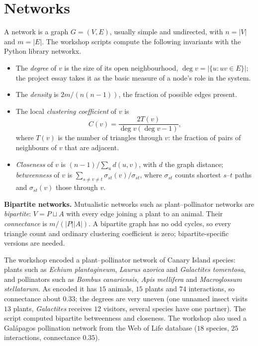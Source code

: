 \section{Networks}
\label{section-networks}

A network is a graph $G=(V,E)$, usually
simple and undirected, with $n=|V|$ and
$m=|E|$. The workshop scripts compute
the following invariants with the Python
library networkx.

\begin{itemize}
\item The \emph{degree} of $v$ is the size
of its open neighbourhood,
$\deg v = |\{u : uv\in E\}|$; the
project essay takes it as the basic measure
of a node's role in the system.
\item The \emph{density} is
$2m/(n(n-1))$, the fraction of possible
edges present.
\item The local \emph{clustering
coefficient} of $v$ is
$$
C(v) = \frac{2T(v)}{\deg v(\deg v-1)},
$$
where $T(v)$ is the number of triangles
through $v$: the fraction of pairs of
neighbours of $v$ that are adjacent.
\item \emph{Closeness} of $v$ is
$(n-1)/\sum_{u}d(u,v)$, with $d$ the
graph distance; \emph{betweenness} of $v$
is $\sum_{s\ne v\ne t}
\sigma_{st}(v)/\sigma_{st}$, where
$\sigma_{st}$ counts shortest $s$--$t$
paths and $\sigma_{st}(v)$ those through
$v$.
\end{itemize}

\textbf{Bipartite networks.}
Mutualistic networks such as
plant--pollinator networks are
\emph{bipartite}: $V = P\sqcup A$ with
every edge joining a plant to an animal.
Their \emph{connectance} is $m/(|P||A|)$.
A bipartite graph has no odd cycles, so
every triangle count and ordinary
clustering coefficient is zero;
bipartite-specific versions are needed.

\begin{example}
\label{example-pollination-network}
The workshop encoded a
plant--pollinator network of Canary Island
species: plants such as
\emph{Echium plantagineum}, \emph{Laurus
azorica} and \emph{Galactites tomentosa},
and pollinators such as \emph{Bombus
canariensis}, \emph{Apis mellifera} and
\emph{Macroglossum stellatarum}. As encoded
it has $15$ animals, $15$ plants and $74$
interactions, so connectance about $0.33$;
the degrees are very uneven (one unnamed
insect visits $13$ plants, \emph{Galactites}
receives $12$ visitors, several species
have one partner). The script computed
bipartite betweenness and closeness. The
workshop also used a Gal\'apagos pollination
network from the Web of Life database
($18$ species, $25$ interactions,
connectance $0.35$).
\end{example}

